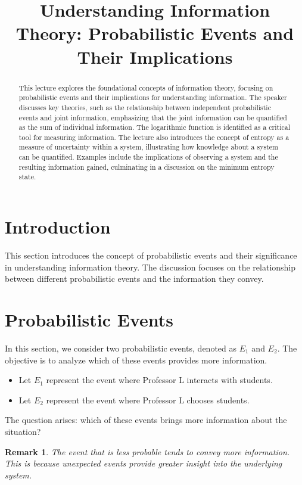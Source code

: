\documentclass[12pt,a4paper]{article}
\title{Understanding Information Theory: Probabilistic Events and Their Implications}
\newtheorem{remark}{Remark}[section]
\begin{document}
\maketitle
\begin{abstract}
This lecture explores the foundational concepts of information theory, focusing on probabilistic events and their implications for understanding information. The speaker discusses key theories, such as the relationship between independent probabilistic events and joint information, emphasizing that the joint information can be quantified as the sum of individual information. The logarithmic function is identified as a critical tool for measuring information. The lecture also introduces the concept of entropy as a measure of uncertainty within a system, illustrating how knowledge about a system can be quantified. Examples include the implications of observing a system and the resulting information gained, culminating in a discussion on the minimum entropy state.
\end{abstract}

\section{Introduction}
This section introduces the concept of probabilistic events and their significance in understanding information theory. The discussion focuses on the relationship between different probabilistic events and the information they convey.

\section{Probabilistic Events}
In this section, we consider two probabilistic events, denoted as \( E_1 \) and \( E_2 \). The objective is to analyze which of these events provides more information.

\begin{itemize}
    \item Let \( E_1 \) represent the event where Professor L interacts with students.
    \item Let \( E_2 \) represent the event where Professor L chooses students.
\end{itemize}

The question arises: which of these events brings more information about the situation? 

\begin{remark}
The event that is less probable tends to convey more information. This is because unexpected events provide greater insight into the underlying system.
\end{remark}
\end{document}
